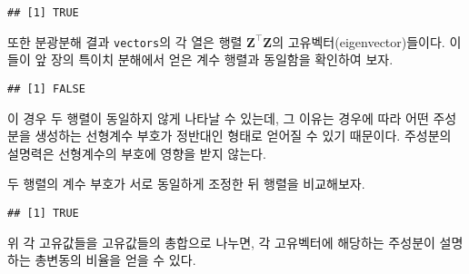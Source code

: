 \documentclass[
]{book}
\newenvironment{Shaded}{\begin{snugshade}}{\end{snugshade}}
\newcommand{\DecValTok}[1]{\textcolor[rgb]{0.00,0.00,0.81}{#1}}
\newcommand{\FunctionTok}[1]{\textcolor[rgb]{0.00,0.00,0.00}{#1}}
\newcommand{\NormalTok}[1]{#1}
\newcommand{\OtherTok}[1]{\textcolor[rgb]{0.56,0.35,0.01}{#1}}
\newcommand{\SpecialCharTok}[1]{\textcolor[rgb]{0.00,0.00,0.00}{#1}}
\begin{document}
\begin{verbatim}
## [1] TRUE
\end{verbatim}

또한 분광분해 결과 \texttt{vectors}의 각 열은 행렬 \(\mathbf{Z}^\top \mathbf{Z}\)의 고유벡터(eigenvector)들이다. 이들이 앞 장의 특이치 분해에서 얻은 계수 행렬과 동일함을 확인하여 보자.

\begin{Shaded}
\end{Shaded}

\begin{verbatim}
## [1] FALSE
\end{verbatim}

이 경우 두 행렬이 동일하지 않게 나타날 수 있는데, 그 이유는 경우에 따라 어떤 주성분을 생성하는 선형계수 부호가 정반대인 형태로 얻어질 수 있기 때문이다. 주성분의 설명력은 선형계수의 부호에 영향을 받지 않는다.

두 행렬의 계수 부호가 서로 동일하게 조정한 뒤 행렬을 비교해보자.

\begin{Shaded}
\end{Shaded}

\begin{verbatim}
## [1] TRUE
\end{verbatim}

위 각 고유값들을 고유값들의 총합으로 나누면, 각 고유벡터에 해당하는 주성분이 설명하는 총변동의 비율을 얻을 수 있다.

\begin{Shaded}
\end{Shaded}
\end{document}
